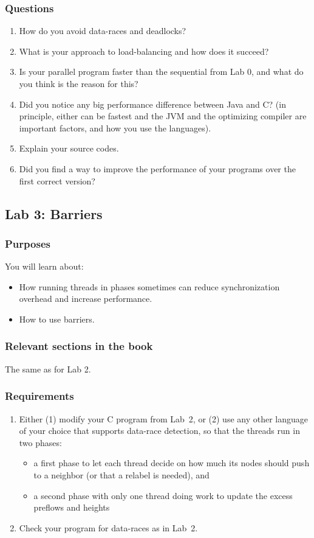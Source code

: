 \documentclass{forsete}
\begin{document}
{\subsubsection*{Questions}
\begin{enumerate}
\item How do you avoid data-races and deadlocks? 
\item What is your approach to load-balancing and how does it succeed?
\item Is your parallel program faster than the sequential from Lab 0, and
what do you think is the reason for this?
\item Did you notice any big performance difference between Java and C? (in principle, either can be fastest and 
the JVM and the optimizing compiler are important factors, and how you use the languages).
\item Explain your source codes.
\item Did you find a way to improve the performance of your programs over the first correct version?

\end{enumerate}

\newpage
\subsection*{Lab 3: Barriers}
\subsubsection*{Purposes}
You will learn about:
\begin{itemize}
\item How running threads in phases sometimes can reduce synchronization overhead and increase performance.
\item How to use barriers.
\end{itemize}

\subsubsection*{Relevant sections in the book}
The same as for Lab 2.
\subsubsection*{Requirements}
\begin{enumerate}
\item Either (1) modify your C program from Lab~2, or (2) use any other language of your choice that
supports data-race detection, so that the threads run in two phases:
\begin{itemize}
\item a first phase to let each thread decide on how much its nodes should push to a neighbor (or that a relabel is needed), and
\item a second phase with only one thread doing work to update the excess preflows and heights
\end{itemize}
\item Check your program for data-races as in Lab~2.


\end{enumerate}}
\end{document}

